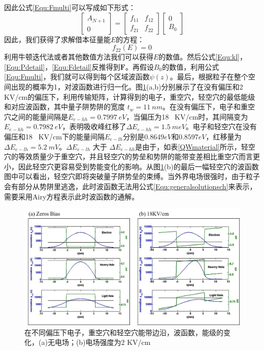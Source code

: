 因此公式\ref{Equ:Fmulti}可以写成如下形式：
\begin{equation}
\label{Equ:Fmulti}
\begin{bmatrix}
A_{N+1}\\
0
\end{bmatrix} = \begin{bmatrix}
f_{11}&f_{12}\\
f_{21}&f_{22}
\end{bmatrix}
\begin{bmatrix}
0\\
B_{0}
\end{bmatrix}
\end{equation}
因此，我们获得了求解借本征量能$E$的方程：
\begin{equation}
\label{Equ:sloveE}
f_{22}(E) = 0
\end{equation}
利用牛顿迭代法或者其他数值方法我们可以获得$E$的数值。然后公式\ref{Equ:kl}，\ref{Equ:Pdetail}，\ref{Equ:Fdetail}反推得到$\textbf{F}$。再假设$B_{0}$的数值，利用公式\ref{Equ:Fmulti}，我们就可以得到每个区域波函数$\psi(z)$。最后，根据粒子在整个空间出现的概率为1，对波函数进行归一化。图\ref{fig_ch2_bias_wavefunction}(a,b)分别展示了在没有偏压和2 KV/cm的偏压下，利用传输矩阵，计算得到的电子，重空穴，轻空穴的最低能级和对应波函数，其中量子阱势阱的宽度 $t_w = 11 ~nm$。在没有偏压下，电子和重空穴之间的能量间隔是$E_{e-hh} = 0.7997 ~eV$，当偏压为18~ KV/cm时，其间隔变为$E_{e-hh} = 0.7982~eV$，表明吸收峰红移了$\Delta E_{e-hh} = 1.5 ~meV$。电子和轻空穴在没有偏压和18 ~KV/cm下的能量间隔$E_{e-lh}$分别是$0.8649 eV$和$0.8597 eV$，红移量为 $\Delta E_{e-lh} = 5.2~ mV$。$\Delta E_{e-lh}$ 大于 $\Delta E_{e-hh}$是由于，如表\ref{QWmaterial}所示，轻空穴的等效质量少于重空穴，并且轻空穴的势垒和势阱的能带变差相比重空穴而言更小，因此轻空穴更容易受到势能变化的影响。从图\ref{fig_ch2_bias_wavefunction}(b)的最后一幅轻空穴的波函数图中可以看出，轻空穴即将突破量子阱势垒的束缚。当外界电场很强时，由于粒子会有部分从势阱里逃逸，此时波函数无法用公式\ref{Equ:generalsolutionsch}来表示，需要采用Airy方程表示此时波函数的通解\cite{chuang1991exciton}。
\begin{figure}[htb]
	\centering
	\includegraphics[width=16cm]{./Pictures/fig_ch2_bias_wavefunction.jpg}
	\caption{在不同偏压下电子，重空穴和轻空穴能带边沿，波函数，能级的变化，(a)无电场；(b)电场强度为2 KV/cm}
	\label{fig_ch2_bias_wavefunction}
\end{figure}


